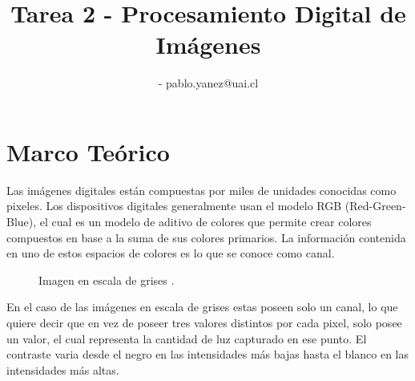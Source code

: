 \documentclass[
  letterpaper,
  twocolumn,
  9pt,
  journal,
  final]{IEEEtran}
\title{Tarea 2 - Procesamiento Digital de Imágenes}
\author{
  \IEEEauthorblockN{Pablo Yáñez S.} - pablo.yanez@uai.cl
}
\begin{document}

\maketitle


\tableofcontents



\vspace{-0.1cm}
\section{Marco Teórico}

Las imágenes digitales están compuestas por miles de unidades conocidas como pixeles.  Los dispositivos digitales generalmente usan el modelo RGB (Red-Green-Blue), el cual es un modelo de aditivo de colores que permite crear colores compuestos en base a la suma de sus colores primarios. La información contenida en uno de estos espacios de colores es lo que se conoce como canal.

\begin{figure}[!tbh]
  \begin{center}
  \end{center}
  \caption{Imagen en escala de grises \cite{carrasco1}.} \label{fig:cameraman}
\end{figure}


En el caso de las imágenes en escala de grises estas poseen solo un canal, lo que quiere decir que en vez de poseer tres valores distintos por cada pixel, solo posee un valor, el cual representa la cantidad de luz capturado en ese punto. El contraste varia desde el negro en las intensidades más bajas hasta el blanco en las intensidades más altas.
\end{document}
